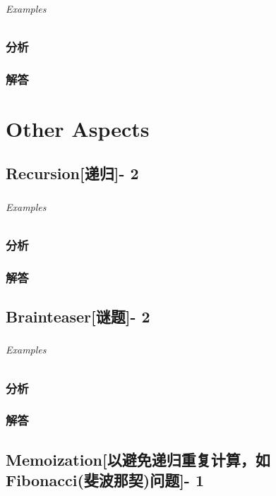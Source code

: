 \documentclass[UTF8,a4paper,12pt]{ctexbook}
\begin{document}
	\subparagraph{Examples}
	
	\subsection{分析}
	
	\subsection{解答}

\chapter{Other Aspects}
\section{Recursion[递归]- 2}	
	\subsection{}
	
	\subparagraph{Examples}
	
	\subsection{分析}
	
	\subsection{解答}
\section{Brainteaser[谜题]- 2}
	\subsection{}
	
	\subparagraph{Examples}
	
	\subsection{分析}
	
	\subsection{解答}
\section{Memoization[以避免递归重复计算，如Fibonacci(斐波那契)问题]- 1}
\end{document}
